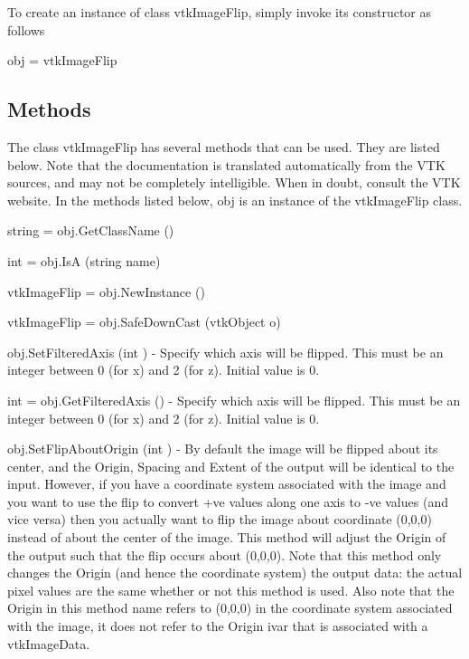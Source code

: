 To create an instance of class vtk\-Image\-Flip, simply invoke its constructor as follows \begin{DoxyVerb}  obj = vtkImageFlip
\end{DoxyVerb}
 \hypertarget{vtkwidgets_vtkxyplotwidget_Methods}{}\subsection{Methods}\label{vtkwidgets_vtkxyplotwidget_Methods}
The class vtk\-Image\-Flip has several methods that can be used. They are listed below. Note that the documentation is translated automatically from the V\-T\-K sources, and may not be completely intelligible. When in doubt, consult the V\-T\-K website. In the methods listed below, {\ttfamily obj} is an instance of the vtk\-Image\-Flip class. 
\begin{DoxyItemize}
\item {\ttfamily string = obj.\-Get\-Class\-Name ()}  
\item {\ttfamily int = obj.\-Is\-A (string name)}  
\item {\ttfamily vtk\-Image\-Flip = obj.\-New\-Instance ()}  
\item {\ttfamily vtk\-Image\-Flip = obj.\-Safe\-Down\-Cast (vtk\-Object o)}  
\item {\ttfamily obj.\-Set\-Filtered\-Axis (int )} -\/ Specify which axis will be flipped. This must be an integer between 0 (for x) and 2 (for z). Initial value is 0.  
\item {\ttfamily int = obj.\-Get\-Filtered\-Axis ()} -\/ Specify which axis will be flipped. This must be an integer between 0 (for x) and 2 (for z). Initial value is 0.  
\item {\ttfamily obj.\-Set\-Flip\-About\-Origin (int )} -\/ By default the image will be flipped about its center, and the Origin, Spacing and Extent of the output will be identical to the input. However, if you have a coordinate system associated with the image and you want to use the flip to convert +ve values along one axis to -\/ve values (and vice versa) then you actually want to flip the image about coordinate (0,0,0) instead of about the center of the image. This method will adjust the Origin of the output such that the flip occurs about (0,0,0). Note that this method only changes the Origin (and hence the coordinate system) the output data\-: the actual pixel values are the same whether or not this method is used. Also note that the Origin in this method name refers to (0,0,0) in the coordinate system associated with the image, it does not refer to the Origin ivar that is associated with a vtk\-Image\-Data.  

\end{DoxyItemize}
